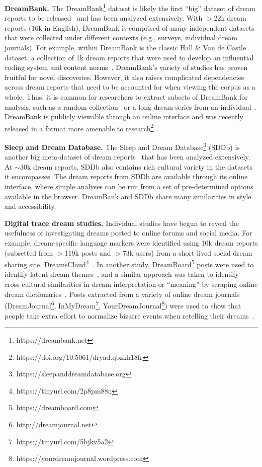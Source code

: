 \documentclass[10pt,a4paper,twocolumn]{article}
\begin{document}
\smallskip
\noindent
\textbf{DreamBank.}
The DreamBank\footnote{https://dreambank.net} dataset is likely the first ``big'' dataset of dream reports to be released~\cite{domhoff2008} and has been analyzed extensively. With $>$22k dream reports (16k in English), DreamBank is comprised of many independent datasets that were collected under different contexts (e.g., surveys, individual dream journals). For example, within DreamBank is the classic Hall \& Van de Castle dataset, a collection of 1k dream reports that were used to develop an influential coding system and content norms~\cite{hall1966}. DreamBank's variety of studies has proven fruitful for novel discoveries. However, it also raises complicated dependencies across dream reports that need to be accounted for when viewing the corpus as a whole. Thus, it is common for researchers to extract subsets of DreamBank for analysis, such as a random collection~\cite{hendrickx2017} or a long dream series from an individual~\cite{fogli2020}. DreamBank is publicly viewable through an online interface and was recently released in a format more amenable to research\footnote{https://doi.org/10.5061/dryad.qbzkh18fr}~\cite{fogli2020}.

\smallskip
\noindent
\textbf{Sleep and Dream Database.}
The Sleep and Dream Database\footnote{https://sleepanddreamdatabase.org} (SDDb) is another big meta-dataset of dream reports~\cite{bulkeley2014} that has been analyzed extensively. At $\sim$30k dream reports, SDDb also contains rich cultural variety in the datasets it encompasses. The dream reports from SDDb are available through its online interface, where simple analyses can be run from a set of pre-determined options available in the browser. DreamBank and SDDb share many similarities in style and accessibility.

\smallskip
\noindent
\textbf{Digital trace dream studies.}
Individual studies have begun to reveal the usefulness of investigating dreams posted to online forums and social media. For example, dream-specific language markers were identified using 10k dream reports (subsetted from $>$119k posts and $>$73k users) from a short-lived social dream sharing site, DreamsCloud\footnote{https://tinyurl.com/2p8pm88n}~\cite{niederhoffer2017}. In another study, DreamBoard\footnote{https://dreamboard.com} posts were used to identify latent dream themes~\cite{mcnamara2019}, and a similar approach was taken to identify cross-cultural similarities in dream interpretation or ``meaning'' by scraping online dream dictionaries~\cite{varol2014}. Posts extracted from a variety of online dream journals (DreamJournal\footnote{http://dreamjournal.net}, InMyDream\footnote{https://tinyurl.com/5bjkv5a2}, YourDreamJournal\footnote{https://yourdreamjournal.wordpress.com}) were used to show that people take extra effort to normalize bizarre events when retelling their dreams~\cite{bardina2021}.
\end{document}
